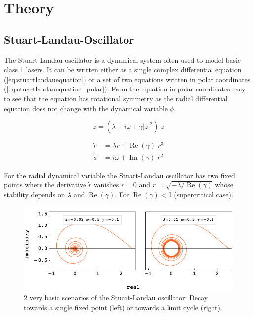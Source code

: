 \section{Theory}




	\subsection{Stuart-Landau-Oscillator}
	The Stuart-Landau oscillator is a dynamical system often used to model basic class 1 lasers. It can be written either as a single complex differential equation (\ref{eq:stuartlandauequation}) or a set of two equations written in polar coordinates (\ref{eq:stuartlandauequation_polar}). From the equation in polar coordinates easy to see that the equation has rotational symmetry as the radial differential equation does not change with the dynamical variable $\phi$.
	
	\begin{equation}	
		\dot{z} = (\lambda +  i \omega + \gamma |z|^2 ) \; z
		\label{eq:stuartlandauequation}		
	\end{equation}
	
	\begin{equation}
		\begin{split}
		\dot{r} & = \lambda r + \operatorname{Re} (\gamma) \; r^{3} \\
		\dot{\phi} &= i \omega + \operatorname{Im}(\gamma) \; r^{2} 
		\end{split}
		\label{eq:stuartlandauequation_polar}
	\end{equation}

	For the radial dynamical variable the Stuart-Landau oscillator has two fixed points where the derivative $\dot{r}$ vanishes $r = 0$ and $r = \sqrt{-\lambda /\operatorname{Re}(\gamma)}$ whose stability depends on $\lambda$ and $\operatorname{Re}(\gamma)$. For $\operatorname{Re}(\gamma) < 0 $ (supercritical case).
	

	\begin{figure}
		\centering
		\includegraphics[width=0.99\linewidth]{pics/stuart_landau_complex_Focus_LC}
		\caption{$2$ very basic scenarios of the Stuart-Landau oscillator: Decay towards a single fixed point (left) or towards a limit cycle (right).}
		\label{fig:stuart_spiral}
	\end{figure}



